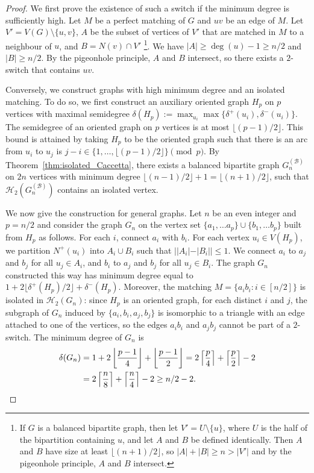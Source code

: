 \documentclass[10pt,a4paper]{amsart}
\begin{document}
\begin{proof}
  We first prove the existence of such a switch if the minimum degree is sufficiently high. Let $M$ be a perfect matching of $G$ and $uv$ be an edge of $M$. Let $V' = V(G) \setminus \{u,v\}$, $A$ be the subset of vertices of
  $V'$ that are matched in $M$ to a neighbour of $u$, and $B = N(v) \cap V'$
  \footnote{If $G$ is a balanced bipartite graph, then let
    $V' = U \setminus \{u\}$, where $U$ is the half of the bipartition
    containing $u$, and let $A$ and $B$ be defined identically. Then $A$ and $B$ have
    size at least $\lfloor (n+1)/2\rfloor$, so $|A| + |B| \ge n > |V'|$ and by the
    pigeonhole principle, $A$ and $B$ intersect.}. We have
  $|A| \ge \deg(u) -1 \ge n/2$ and $|B| \ge n/2$. By the pigeonhole principle, $A$
  and $B$ intersect, so there exists a $2$-switch that contains $uv$.

  Conversely, we construct graphs with high minimum degree and an isolated
  matching. To do so, we first construct an auxiliary oriented graph $H_p$ on
  $p$ vertices with maximal semidegree
  $\delta(H_p) := \max_{u_i} \max \{\delta^+(u_i), \delta^-(u_i)\}$. The
  semidegree of an oriented graph on $p$ vertices is at most
  $\lfloor (p-1)/2 \rfloor$. This bound is attained by taking $H_p$ to be the
  oriented graph such that there is an arc from $u_i$ to $u_j$ is
  $j-i \in \{1, \dots, \lfloor (p-1)/2 \rfloor\} \pmod p$. By
  Theorem~\ref{thm:isolated_Caccetta}, there exists a balanced bipartite graph
  $G_n^{(\mathcal B)}$ on $2n$ vertices with minimum degree
  $\lfloor (n-1)/2 \rfloor +1 = \lfloor (n+1)/2\rfloor$, such that
  $\mathcal H_2(G_n^{(\mathcal B)})$ contains an isolated vertex.

  We now give the construction for general graphs. Let $n$ be an even integer and $p = n/2$
  and consider the graph $G_n$ on the vertex set
  $\{a_1, \dots a_{p}\} \cup \{b_1, \dots b_p\}$ built from $H_p$ as
  follows. For each $i$, connect $a_i$ with $b_i$. For each vertex
  $u_i \in V(H_p)$, we partition $N^+(u_i)$ into $A_i \cup B_i$ such that
  $||A_i|- |B_i||\le 1$. We connect $a_i$ to $a_j$ and $b_j$ for all
  $u_j \in A_i$, and $b_i$ to $a_j$ and $b_j$ for all $u_j \in B_i$. The graph
  $G_n$ constructed this way has minimum degree equal to
  $1 + 2\lfloor \delta^+(H_p)/2\rfloor + \delta^-(H_p)$. Moreover, the matching
  $M = \{a_ib_i \colon i \in [n/2]\}$ is isolated in $\mathcal H_2(G_n)$: since $H_p$ is
  an oriented graph, for each distinct $i$ and $j$, the subgraph of $G_n$
  induced by $\{a_i,b_i,a_j,b_j\}$ is isomorphic to a triangle with an edge
  attached to one of the vertices, so the edges $a_ib_i$ and $a_jb_j$ cannot be
  part of a $2$-switch. The minimum degree of $G_n$ is
  \begin{align*}
    \delta(G_n) &= 1 + 2 \left\lfloor \frac{p-1}4 \right \rfloor +  \left\lfloor
                  \frac{p-1}2 \right \rfloor
    = 2\left\lceil \frac{p}4 \right \rceil +  \left\lceil
      \frac{p}2 \right \rceil -2\\
    &= 2\left\lceil \frac{n}8 \right \rceil +  \left\lceil
      \frac{n}4 \right \rceil -2 \ge n/2 -2. \qedhere
  \end{align*}
\end{proof}
\end{document}
